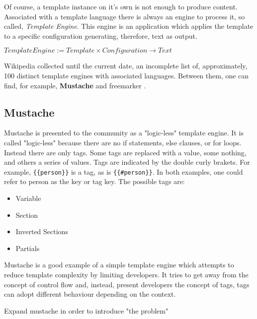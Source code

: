 Of course, a template instance on it's own is not enough to produce content. Associated with a template language there is always an engine to process it, so called, \textit{Template Engine}. This engine is an application which applies the template to a specific configuration generating, therefore, text as output.

\begin{center}
    $TemplateEngine := Template \times Configuration \rightarrow Text$
\end{center}

Wikipedia collected \cite{WikipediaComparisonEngines} until the current date, an incomplete list of, approximately, 100 distinct template engines with associated languages. Between them, one can find, for example, \textbf{Mustache} \cite{mustache} and freemarker \cite{Forsythe2013InstantFreemarker}.

\subsection{Mustache}

\begin{review}
Mustache is presented to the community as a "logic-less" template engine. It is called "logic-less" because there are no if statements, else clauses, or for loops. Instead there are only tags. Some tags are replaced with a value, some nothing, and others a series of values. 
Tags are indicated by the double curly brakets. For example, \texttt{\{\{person\}\}} is a tag, as is \texttt{\{\{#person\}\}}. In both examples, one could refer to person as the key or tag key. The possible tags are:

\begin{itemize}
    \item Variable \todo
    \item Section \todo
    \item Inverted Sections \todo
    \item Partials \todo
\end{itemize}

Mustache is a good example of a simple template engine which attempts to reduce template complexity by limiting developers. It tries to get away from the concept of control flow and, instead, present developers the concept of tags, tags can adopt different behaviour depending on the context.

\begin{expand}
    Expand mustache in order to introduce "the problem"
\end{expand}
\end{review}

